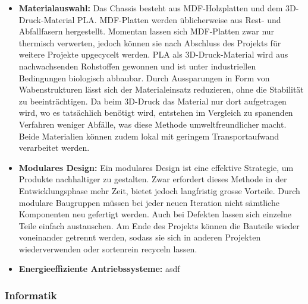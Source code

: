 \documentclass[../../main.tex]{subfiles} %
\begin{document}
\begin{itemize}
  \item \textbf{Materialauswahl:} 
  Das Chassis besteht aus MDF-Holzplatten und dem 3D-Druck-Material PLA. 
  MDF-Platten werden üblicherweise aus Rest- und Abfallfasern hergestellt. 
  Momentan lassen sich MDF-Platten zwar nur thermisch verwerten, jedoch können 
  sie nach Abschluss des Projekts für weitere Projekte upgecycelt werden.
  PLA als 3D-Druck-Material wird aus nachwachsenden Rohstoffen gewonnen und ist 
  unter industriellen Bedingungen biologisch abbaubar. Durch Aussparungen in Form 
  von Wabenstrukturen lässt sich der Materialeinsatz reduzieren, ohne die Stabilität 
  zu beeinträchtigen. Da beim 3D-Druck das Material nur dort aufgetragen wird, wo es 
  tatsächlich benötigt wird, entstehen im Vergleich zu spanenden Verfahren weniger Abfälle, 
  was diese Methode umweltfreundlicher macht.
  Beide Materialien können zudem lokal mit geringem Transportaufwand verarbeitet werden.

  \item \textbf{Modulares Design:}
  Ein modulares Design ist eine effektive Strategie, um Produkte nachhaltiger zu gestalten.
  Zwar erfordert dieses Methode in der Entwicklungsphase mehr Zeit, bietet jedoch langfristig
  grosse Vorteile. Durch modulare Baugruppen müssen bei jeder neuen Iteration nicht sämtliche Komponenten
  neu gefertigt werden. Auch bei Defekten lassen sich einzelne Teile einfach austauschen.
  Am Ende des Projekts können die Bauteile wieder voneinander getrennt werden, sodass sie sich in 
  anderen Projekten wiederverwenden oder sortenrein recyceln lassen.

  \item \textbf{Energieeffiziente Antriebssysteme:} asdf
\end{itemize}

\subsubsection{Informatik}
\end{document}
